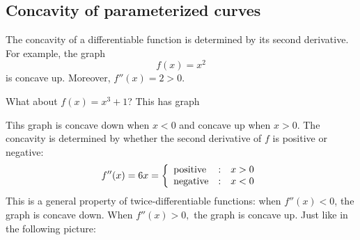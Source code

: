 \documentclass[10pt]{article}
\theoremstyle{definition}
\newcommand{\1}[1]{\textbf{1}_{\left[#1\right]}} %
\begin{document}
\begin{max-comment}
  \subsection{Concavity of parameterized curves}
  The concavity of a differentiable function is determined by its second
  derivative. For example, the graph
  \begin{equation*}
    f(x) = x^{2}
  \end{equation*}
  is concave up. Moreover, $f''(x) = 2>0$.

  What about $f(x) = x^{3}+1$? This has graph

  \begin{center}
  \end{center}
  Tihs graph is concave down when $x<0$ and concave up when $x>0$. The
  concavity is determined by whether the second derivative of $f$ is positive
  or negative:
  \begin{equation*}
    f''(x) = 6x = \left\{ \begin{array}{l@{\quad:\quad}l} \text{positive} &x>0 \\ \text{negative}&x<0 \end{array}\right.
  \end{equation*}
  This is a general property of twice-differentiable functions: when
  $f''(x)<0$, the graph is concave down. When $f''(x)>0,$ the graph is concave
  up. Just like in the following picture:

  \begin{center}
  \end{center}



\end{max-comment}
\end{document}
